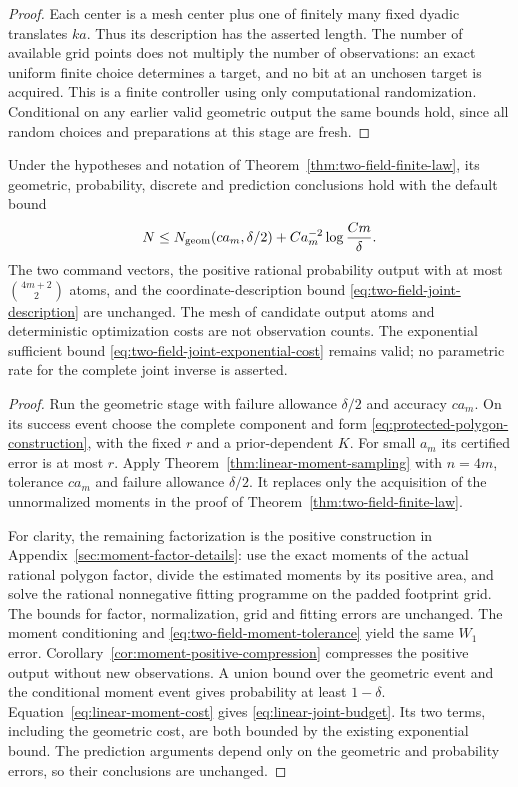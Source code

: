 \begin{proof}
Each center is a mesh center plus one of finitely many fixed dyadic
translates $ka$. Thus its description has the asserted length. The
number of available grid points does not multiply the number of
observations: an exact uniform finite choice determines a target,
and no bit at an unchosen target is acquired. This is a finite
controller using only computational randomization. Conditional on
any earlier valid geometric output the same bounds hold, since all
random choices and preparations at this stage are fresh.
\end{proof}

\begin{corollary}
\label{cor:linear-joint-budget}
Under the hypotheses and notation of
Theorem~\ref{thm:two-field-finite-law}, its geometric, probability,
discrete and prediction conclusions hold with the default bound
\begin{equation}\label{eq:linear-joint-budget}
 N\le N_{\rm geom}(c a_m,\delta/2)
                   +Ca_m^{-2}\log\frac{Cm}{\delta}.
\end{equation}
The two command vectors, the positive rational probability output
with at most $\binom{4m+2}{2}$ atoms, and the coordinate-description
bound \eqref{eq:two-field-joint-description} are unchanged. The
mesh of candidate output atoms and deterministic optimization costs
are not observation counts. The exponential sufficient bound
\eqref{eq:two-field-joint-exponential-cost} remains valid; no
parametric rate for the complete joint inverse is asserted.
\end{corollary}
\begin{proof}
Run the geometric stage with failure allowance $\delta/2$ and
accuracy $c a_m$. On its success event choose the complete component
and form \eqref{eq:protected-polygon-construction}, with the fixed
$r$ and a prior-dependent $K$. For small $a_m$ its certified error
is at most $r$. Apply Theorem~\ref{thm:linear-moment-sampling} with
$n=4m$, tolerance $c a_m$ and failure allowance $\delta/2$.
It replaces only the acquisition of the unnormalized moments in
the proof of Theorem~\ref{thm:two-field-finite-law}.

For clarity, the remaining factorization is the positive construction
in Appendix~\ref{sec:moment-factor-details}: use the exact moments
of the actual rational polygon factor, divide the estimated moments
by its positive area, and solve the rational nonnegative fitting
programme on the padded footprint grid. The bounds for factor,
normalization, grid and fitting errors are unchanged. The moment
conditioning and \eqref{eq:two-field-moment-tolerance} yield the
same $W_1$ error. Corollary~\ref{cor:moment-positive-compression}
compresses the positive output without new observations. A union
bound over the geometric event and the conditional moment event gives
probability at least $1-\delta$. Equation~\eqref{eq:linear-moment-cost}
gives \eqref{eq:linear-joint-budget}. Its two terms, including the
geometric cost, are both bounded by the existing exponential bound.
The prediction arguments depend only on the geometric and probability
errors, so their conclusions are unchanged.
\end{proof}

